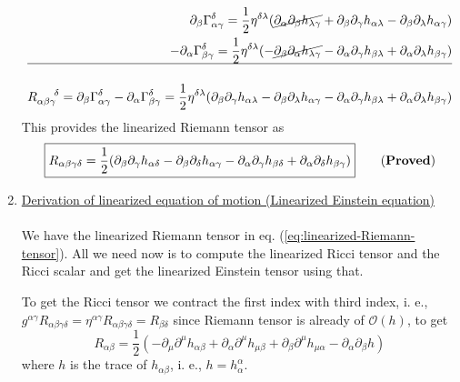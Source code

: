 \documentclass[10pt]{article}
\begin{document}
\begin{enumerate}
    \begin{align}
        \partial_\beta \Gamma^{\delta}_{\alpha\gamma} = \frac{1}{2}\eta^{\delta\lambda} (\cancel{\partial_{\alpha} \partial_{\beta} h_{\lambda\gamma}} + \partial_\beta\partial_\gamma h_{\alpha\lambda} - \partial_\beta \partial_\lambda h_{\alpha\gamma}) \\
        - \partial_\alpha \Gamma^{\delta}_{\beta\gamma} = \frac{1}{2}\eta^{\delta\lambda} (- \cancel{\partial_{\beta} \partial_{\alpha} h_{\lambda\gamma}} - \partial_\alpha\partial_\gamma h_{\beta\lambda} + \partial_\alpha \partial_\lambda h_{\beta\gamma})\\
        \hline \nonumber \\
        R_{\alpha\beta\gamma}^{~~~~\delta} = \partial_\beta \Gamma^{\delta}_{\alpha\gamma} - \partial_\alpha \Gamma^{\delta}_{\beta\gamma} = \frac{1}{2}\eta^{\delta\lambda}(\partial_\beta \partial_\gamma h_{\alpha\lambda} - \partial_\beta\partial_\lambda h_{\alpha\gamma} - \partial_\alpha\partial_\gamma h_{\beta\lambda} + \partial_\alpha\partial_\lambda h_{\beta\gamma})
    \end{align}
    This provides the linearized Riemann tensor as
    \begin{equation}
        \label{eq:linearized-Riemann-tensor}
        \boxed{R_{\alpha\beta\gamma\delta} = \frac{1}{2}(\partial_\beta\partial_\gamma h_{\alpha\delta} - \partial_\beta \partial_\delta h_{\alpha\gamma} - \partial_\alpha\partial_\gamma h_{\beta\delta} + \partial_\alpha\partial_\delta h_{\beta\gamma})}\qquad \textrm{({\bfseries Proved})}
    \end{equation}
    
    \item \underline{Derivation of linearized equation of motion (Linearized Einstein equation)}\\\\
    We have the linearized Riemann tensor in eq. (\ref{eq:linearized-Riemann-tensor}). All we need now is to compute the linearized Ricci tensor and the Ricci scalar and get the linearized Einstein tensor using that.
    
    To get the Ricci tensor we contract the first index with third index, i. e., $g^{\alpha\gamma}R_{\alpha\beta\gamma\delta} = \eta^{\alpha\gamma}R_{\alpha\beta\gamma\delta} = R_{\beta\delta}$ since Riemann tensor is already of $\mathcal{O}(h)$, to get
    \begin{equation}
        \label{eq:Ricci-tensor}
        R_{\alpha\beta} = \frac{1}{2}(-\partial_\mu \partial^\mu h_{\alpha\beta} + \partial_\alpha\partial^\mu h_{\mu\beta} + \partial_\beta\partial^\mu h_{\mu\alpha} - \partial_\alpha \partial_\beta h)
    \end{equation}
    where $h$ is the trace of $h_{\alpha\beta}$, i. e., $h = h^\alpha_\alpha$.
    

\end{enumerate}
\end{document}

